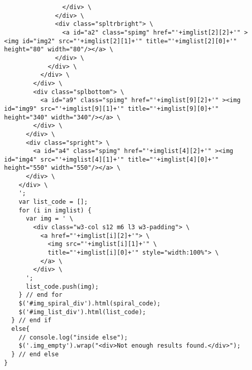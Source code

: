 \begin{listing}[!htbp]
\begin{verbatim}
                </div> \
              </div> \
              <div class="spltrbright"> \
                <a id="a2" class="spimg" href="'+imglist[2][2]+'" ><img id="img2" src="'+imglist[2][1]+'" title="'+imglist[2][0]+'" height="80" width="80"/></a> \
              </div> \
            </div> \
          </div> \
        </div> \
        <div class="splbottom"> \
          <a id="a9" class="spimg" href="'+imglist[9][2]+'" ><img id="img9" src="'+imglist[9][1]+'" title="'+imglist[9][0]+'" height="340" width="340"/></a> \
        </div> \
      </div> \
      <div class="spright"> \
        <a id="a4" class="spimg" href="'+imglist[4][2]+'" ><img id="img4" src="'+imglist[4][1]+'" title="'+imglist[4][0]+'" height="550" width="550"/></a> \
      </div> \
    </div> \
    ';
    var list_code = [];
    for (i in imglist) {
      var img = ' \
        <div class="w3-col s12 m6 l3 w3-padding"> \
          <a href="'+imglist[i][2]+'"> \
            <img src="'+imglist[i][1]+'" \
            title="'+imglist[i][0]+'" style="width:100%"> \
          </a> \
        </div> \
      ';
      list_code.push(img);
    } // end for
    $('#img_spiral_div').html(spiral_code);
    $('#img_list_div').html(list_code);
  } // end if
  else{
    // console.log("inside else");
    $('.img_empty').wrap("<div>Not enough results found.</div>");
  } // end else
}
  \end{verbatim}
\caption[]{}
\label{code:imgspiral}
\end{listing}